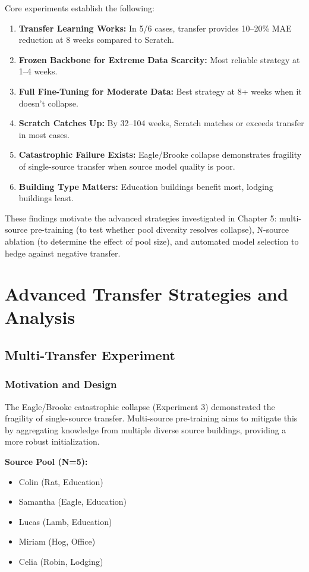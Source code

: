 \documentclass[12pt,a4paper]{report}
\begin{document}
Core experiments establish the following:

\begin{enumerate}
    \item \textbf{Transfer Learning Works:} In 5/6 cases, transfer provides 10--20\% MAE reduction at 8 weeks compared to Scratch.
    \item \textbf{Frozen Backbone for Extreme Data Scarcity:} Most reliable strategy at 1--4 weeks.
    \item \textbf{Full Fine-Tuning for Moderate Data:} Best strategy at 8+ weeks when it doesn't collapse.
    \item \textbf{Scratch Catches Up:} By 32--104 weeks, Scratch matches or exceeds transfer in most cases.
    \item \textbf{Catastrophic Failure Exists:} Eagle/Brooke collapse demonstrates fragility of single-source transfer when source model quality is poor.
    \item \textbf{Building Type Matters:} Education buildings benefit most, lodging buildings least.
\end{enumerate}

These findings motivate the advanced strategies investigated in Chapter 5: multi-source pre-training (to test whether pool diversity resolves collapse), N-source ablation (to determine the effect of pool size), and automated model selection to hedge against negative transfer.

\chapter{Advanced Transfer Strategies and Analysis}

\section{Multi-Transfer Experiment}

\subsection{Motivation and Design}

The Eagle/Brooke catastrophic collapse (Experiment 3) demonstrated the fragility of single-source transfer. Multi-source pre-training aims to mitigate this by aggregating knowledge from multiple diverse source buildings, providing a more robust initialization.

\textbf{Source Pool (N=5):}
\begin{itemize}
    \item Colin (Rat, Education)
    \item Samantha (Eagle, Education)
    \item Lucas (Lamb, Education)
    \item Miriam (Hog, Office)
    \item Celia (Robin, Lodging)
\end{itemize}
\end{document}
